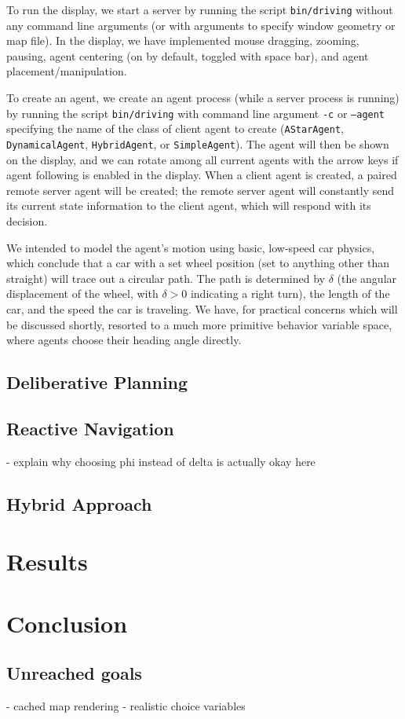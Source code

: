 \documentclass{article}
\newcommand{\code}{\texttt}
\begin{document}
To run the display, we start a server by running the script \code{bin/driving}
without any command line arguments (or with arguments to specify window geometry
or map file). In the display, we have implemented mouse dragging, zooming,
pausing, agent centering (on by default, toggled with space bar), and agent
placement/manipulation.

To create an agent, we create an agent process (while a server process is
running) by running the script \code{bin/driving} with command line argument
\code{-c} or \code{--agent} specifying the name of the class of client agent to
create (\code{AStarAgent}, \code{DynamicalAgent}, \code{HybridAgent}, or
\code{SimpleAgent}). The agent will then be shown on the display, and we can
rotate among all current agents with the arrow keys if agent following is
enabled in the display. When a client agent is created, a paired remote server
agent will be created; the remote server agent will constantly send its current
state information to the client agent, which will respond with its decision.

We intended to model the agent's motion using basic, low-speed car physics,
which conclude that a car with a set wheel position (set to anything other than
straight) will trace out a circular path. The path is determined by $\delta$
(the angular displacement of the wheel, with $\delta>0$ indicating a right
turn), the length of the car, and the speed the car is traveling. We have, for
practical concerns which will be discussed shortly, resorted to a much more
primitive behavior variable space, where agents choose their heading angle
directly.

\subsection{Deliberative Planning}

\subsection{Reactive Navigation}
- explain why choosing phi instead of delta is actually okay here

\subsection{Hybrid Approach}

\section{Results}

\section{Conclusion}
\subsection{Unreached goals}
- cached map rendering
- realistic choice variables
\end{document}
